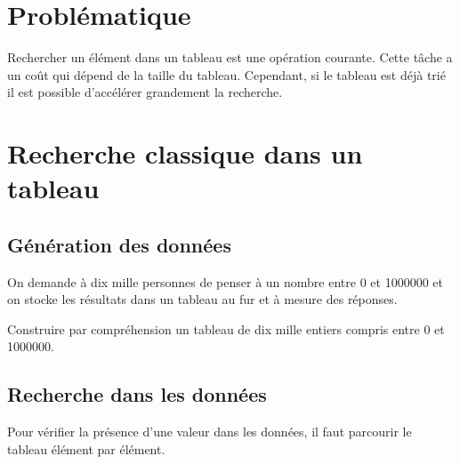 \documentclass[a4paper,11pt]{article}
\begin{document}
\section{Problématique}
Rechercher un élément dans un tableau est une opération courante. Cette tâche a un coût qui dépend de la taille du tableau.
Cependant, si le tableau est déjà trié il est possible d'accélérer grandement la recherche.
\begin{center}
\end{center}
\section{Recherche classique dans un tableau}
\subsection{Génération des données}
On demande à dix mille personnes de penser à un nombre entre 0 et 1000000 et on stocke les résultats dans un tableau au fur et à mesure des réponses.
\begin{activite}
    Construire par compréhension un tableau de dix mille entiers compris entre 0 et 1000000.
\end{activite}
\subsection{Recherche dans les données}
Pour vérifier la présence d'une valeur dans les données, il faut parcourir le tableau élément par élément.
\begin{center}
\end{center}
\end{document}
